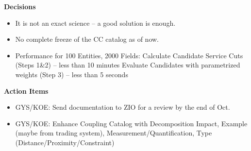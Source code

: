\textbf{Decisions}

\begin{itemize}
\item It is not an exact science – a good solution is enough.
\item No complete freeze of the CC catalog as of now.
\item Performance for 100 Entities, 2000 Fields:
\subitem Calculate Candidate Service Cuts (Steps 1\&2) – less than 10 minutes
\subitem Evaluate Candidates with parametrized weights (Step 3) – less than 5 seconds
\end{itemize}
 
\textbf{Action Items}

\begin{itemize}
\item GYS/KOE: Send documentation to ZIO for a review by the end of Oct.
\item GYS/KOE: Enhance Coupling Catalog with Decomposition Impact, Example (maybe from trading system), Measurement/Quantification, Type (Distance/Proximity/Constraint)
\end{itemize}